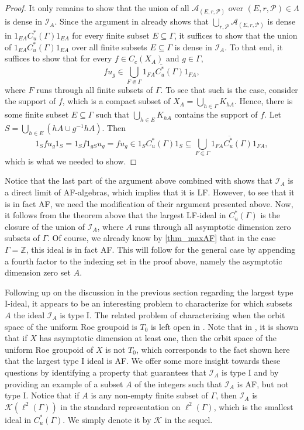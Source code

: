 \documentclass[12pt, a4paper, oneside]{amsart}
\newcommand{\0}{\mathbf{0}}
\newcommand{\1}{\mathbf{1}}
\newcommand{\Z}{\mathbb{Z}}   %
\newcommand{\A}{\mathscr{A}}
\renewcommand{\P}{\mathcal{P}} %
\newcommand{\I}{\mathscr{I}}
\newcommand{\K}{\mathscr{K}}
\begin{document}
\begin{proof}
	It only remains to show that the union of all \(\A_{(E, r, \P)}\) over \((E, r, \P) \in \Lambda\) is dense in \(\I_A\). Since the argument in \cite{li2018low} already shows that \(\bigcup_{r, \P} \A_{(E, r, \P)}\) is dense in \(1_{EA} C_u^*(\Gamma) 1_{EA}\) for every finite subset \(E \subseteq \Gamma\), it suffices to show that the union of \(1_{EA} C_u^*(\Gamma) 1_{EA}\) over all finite subsets \(E \subseteq \Gamma\) is dense in \(\I_A\). To that end, it suffices to show that for every \(f \in C_c(X_A)\) and \(g \in \Gamma\), \[fu_g \in  \overline{ \bigcup_{F \Subset  \Gamma} 1_{FA} C_u^*(\Gamma) 1_{FA} },\] where \(F\) runs through all finite subsets of \(\Gamma\). To see that such is the case, consider the support of \(f\), which is a compact subset of \(X_A = \bigcup_{h \in \Gamma} K_{hA}\). Hence, there is some finite subset \(E \subseteq \Gamma\) such that \(\bigcup_{h \in E} K_{hA}\) contains the support of $f$. Let \(S = \bigcup_{h \in E} (hA \cup g^{-1}hA)\). Then \[1_S f u_g 1_S = 1_S f 1_{gS} u_g = f u_g \in 1_S C^*_u(\Gamma) 1_S \subseteq \overline{ \bigcup_{F \Subset \Gamma} 1_{FA} C_u^*(\Gamma) 1_{FA}},\] which is what we needed to show. 
	\end{proof}
	
	Notice that the last part of the argument above combined with \cite[Theorem 2.2]{li2018low} shows that \(\I_A\) is a direct limit of AF-algebras, which implies that it is LF. However, to see that it is in fact AF, we need the modification of their argument presented above. Now, it follows from the theorem above that the largest LF-ideal in \(C_u^*(\Gamma)\) is the closure of the union of \(\I_A\), where \(A\) runs through all asymptotic dimension zero subsets of \(\Gamma\). Of course, we already know by \cref{thm_maxAF} that in the case \(\Gamma = \Z\), this ideal is in fact AF. This will follow for the general case by appending a fourth factor to the indexing set in the proof above, namely the asymptotic dimension zero set \(A\). 
	
	Following up on the discussion in the previous section regarding the largest type I-ideal, it appears to be an interesting problem to characterize for which subsets \(A\) the ideal \(\I_A\) is type I. The related problem of characterizing when the orbit space of the uniform Roe groupoid is \(T_0\) is left open in \cite[Problem 2.26]{braga2026}. Note that in \cite[Theorem 2.25]{braga2026}, it is shown that if \(X\) has asymptotic dimension at least one, then the orbit space of the uniform Roe groupoid of \(X\) is not \(T_0\), which corresponds to the fact shown here that the largest type I ideal is AF. We offer some more insight towards these questions by identifying a property that guarantees that \(\I_A\) is type I and by providing an example of a subset \(A\) of the integers such that \(\I_A\) is AF, but not type I. Notice that if \(A\) is any non-empty finite subset of \(\Gamma\), then \(\I_A\) is \(\K(\ell^2(\Gamma))\) in the standard representation on \(\ell^2(\Gamma)\), which is the smallest ideal in \(C_u^*(\Gamma)\). We simply denote it by \(\K\) in the sequel. 
	
\end{document}
